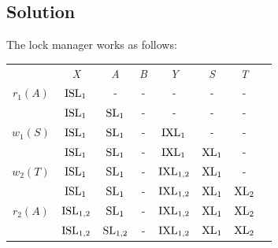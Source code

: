 \documentclass[12pt, a4paper]{report}
\begin{document}
    \subsection*{Solution}
        The lock manager works as follows: 
        \begin{table}[H]
            \centering
            \begin{tabular}{c|cccccc|c}
            \cline{2-7}
            \textit{}                          & \textit{X}               & \textit{A}              & \textit{B} & \textit{Y}               & \textit{S}          & \textit{T}          & \textit{}    \\ \cline{1-7}
            \multicolumn{1}{|c|}{$r_1(A)$}     & $\textnormal{ISL}_1$     & -                       & -          & -                        & -                   & -                   &              \\
            \multicolumn{1}{|c|}{}             & $\textnormal{ISL}_1$     & $\textnormal{SL}_1$     & -          & -                        & -                   & -                   &              \\
            \multicolumn{1}{|c|}{$w_1(S)$}     & $\textnormal{ISL}_1$     & $\textnormal{SL}_1$     & -          & $\textnormal{IXL}_1$     & -                   & -                   &              \\
            \multicolumn{1}{|c|}{}             & $\textnormal{ISL}_1$     & $\textnormal{SL}_1$     & -          & $\textnormal{IXL}_1$     & $\textnormal{XL}_1$ & -                   &              \\
            \multicolumn{1}{|c|}{$w_2(T)$}     & $\textnormal{ISL}_1$     & $\textnormal{SL}_1$     & -          & $\textnormal{IXL}_{1,2}$ & $\textnormal{XL}_1$ & -                   &              \\
            \multicolumn{1}{|c|}{}             & $\textnormal{ISL}_1$     & $\textnormal{SL}_1$     & -          & $\textnormal{IXL}_{1,2}$ & $\textnormal{XL}_1$ & $\textnormal{XL}_2$ &              \\
            \multicolumn{1}{|c|}{$r_2(A)$}     & $\textnormal{ISL}_{1,2}$ & $\textnormal{SL}_1$     & -          & $\textnormal{IXL}_{1,2}$ & $\textnormal{XL}_1$ & $\textnormal{XL}_2$ &              \\
            \multicolumn{1}{|c|}{}             & $\textnormal{ISL}_{1,2}$ & $\textnormal{SL}_{1,2}$ & -          & $\textnormal{IXL}_{1,2}$ & $\textnormal{XL}_1$ & $\textnormal{XL}_2$ &              \\

\end{tabular}
\end{table}
\end{document}
